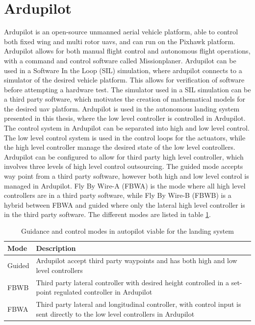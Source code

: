 \section{Ardupilot}\label{ss:ardupilot}
Ardupilot is an open-source unmanned aerial vehicle platform, able to control both fixed wing and multi rotor \glspl{uav}, and can run on the Pixhawk platform. Ardupilot allows for both manual flight control and autonomous flight operations, with a command and control software called Missionplaner. Ardupilot can be used in a Software In the Loop (SIL) simulation, where ardupilot connects to a simulator of the desired vehicle platform. This allows for verification of software before attempting a hardware test. The simulator used in a SIL simulation can be a third party software, which motivates the creation of mathematical models for the desired \gls{uav} platform. Ardupilot is used in the autonomous landing system presented in this thesis, where the low level controller is controlled in Ardupilot. The control system in Ardupilot can be separated into high and low level control. The low level control system is used in the control loops for the actuators, while the high level controller manage the desired state of the low level controllers. Ardupilot can be configured to allow for third party high level controller, which involves three levels of high level control outsourcing. The guided mode accepts way point from a third party software, however both high and low level control is managed in Ardupilot. Fly By Wire-A (FBWA) is the mode where all high level controllers are in a third party software, while Fly By Wire-B (FBWB) is a hybrid between FBWA and guided where only the lateral high level controller is in the third party software. The different modes are listed in table \ref{tb:ArduPilotMode}.
\begin{table}[H]
\centering
\begin{tabular}{| p{3cm} | p{5cm}|}
\hline
\textbf{Mode}	&	\textbf{Description} \\ \hline
Guided			& Ardupilot accept third party waypoints and has both high and low level controllers										\\ \hline
FBWB			& Third party lateral controller with desired height controlled in a set-point regulated controller in Ardupilot \\ \hline
FBWA			& Third party lateral and longitudinal controller, with control input is sent directly to the low level controllers in Ardupilot 	\\ \hline
\end{tabular}
\caption{Guidance and control modes in autopilot viable for the landing system}
\label{tb:ArduPilotMode}
\end{table}

